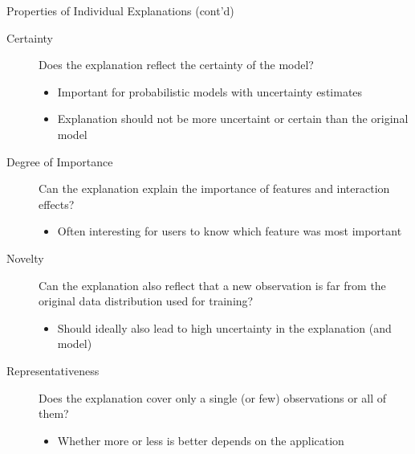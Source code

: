 \documentclass[aspectratio=169]{../latex_main/tntbeamer}  %
\begin{document}
\begin{frame}[c]{Properties of Individual Explanations (cont'd)~}
	
	\begin{description}
        \item[Certainty] Does the explanation reflect the certainty of the model?
        \begin{itemize}
            \item Important for probabilistic models with uncertainty estimates
            \item Explanation should not be more uncertaint or certain than the original model
        \end{itemize}
        \medskip
        \pause
        \item[Degree of Importance] Can the explanation explain the importance of features and interaction effects?
        \begin{itemize}
            \item Often interesting for users to know which feature was most important
        \end{itemize}
        \medskip
        \pause
        \item[Novelty] Can the explanation also reflect that a new observation is far from the original data distribution used for training?
        \begin{itemize}
            \item Should ideally also lead to high uncertainty in the explanation (and model)
        \end{itemize}
        \pause
        \item[Representativeness] Does the explanation cover only a single (or few) observations or all of them?
        \begin{itemize}
            \item Whether more or less is better depends on the application
        \end{itemize}
        
	\end{description}
\end{frame}
	
\end{document}
